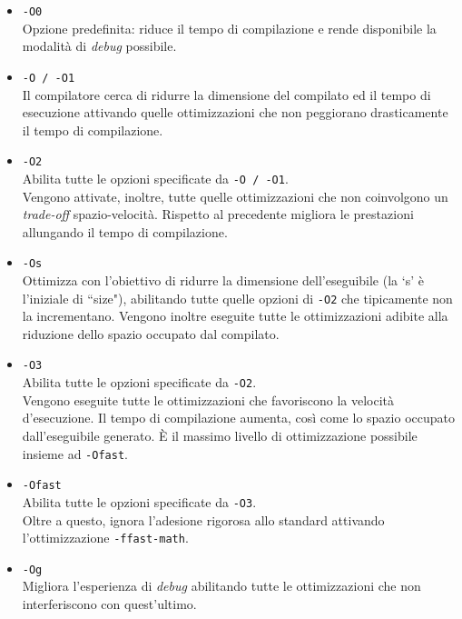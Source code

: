 \begin{itemize}
  
  \item \verb|-O0|\\
  Opzione predefinita: riduce il tempo di compilazione e rende disponibile la 
  modalità di \emph{debug} possibile.
  
  \item \verb|-O / -O1|\\
  Il compilatore cerca di ridurre la dimensione del compilato ed il tempo di 
  esecuzione attivando quelle ottimizzazioni che non peggiorano drasticamente 
  il tempo di compilazione.
  
  \item \verb|-O2|\\
  Abilita tutte le opzioni specificate da \verb|-O / -O1|.\\
  Vengono attivate, inoltre, tutte quelle ottimizzazioni che non coinvolgono un 
  \emph{trade-off} spazio-velocità. Rispetto al precedente migliora le 
  prestazioni allungando il tempo di compilazione.
  
  \item \verb|-Os|\\
  Ottimizza con l'obiettivo di ridurre la dimensione dell'eseguibile (la `s' è 
  l'iniziale di ``size"), abilitando tutte quelle opzioni di \verb|-O2| che 
  tipicamente non la incrementano. Vengono inoltre eseguite tutte le 
  ottimizzazioni adibite alla riduzione dello spazio occupato dal compilato.
  
  \item \verb|-O3|\\
  Abilita tutte le opzioni specificate da \verb|-O2|.\\
  Vengono eseguite tutte le ottimizzazioni che favoriscono la velocità 
  d'esecuzione. %
  Il tempo di compilazione aumenta, così come lo spazio occupato 
  dall'eseguibile generato. \`E il massimo livello di ottimizzazione possibile 
  insieme ad \verb|-Ofast|.
  
  \item \verb|-Ofast|\\
  Abilita tutte le opzioni specificate da \verb|-O3|.\\
  Oltre a questo, ignora l'adesione rigorosa allo standard attivando 
  l'ottimizzazione \verb|-ffast-math|.
  
  \item \verb|-Og|\\
  Migliora l'esperienza di \emph{debug} abilitando tutte le ottimizzazioni che 
  non interferiscono con quest'ultimo.
  
\end{itemize}
